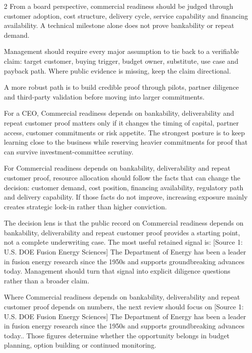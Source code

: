 \documentclass[10pt,a4paper]{article}
\begin{document}
\begin{multicols}{2}
{\small From a board perspective, commercial readiness should be judged through customer adoption, cost structure, delivery cycle, service capability and financing availability. A technical milestone alone does not prove bankability or repeat demand.}\par
{\small Management should require every major assumption to tie back to a verifiable claim: target customer, buying trigger, budget owner, substitute, use case and payback path. Where public evidence is missing, keep the claim directional.}\par
{\small A more robust path is to build credible proof through pilots, partner diligence and third-party validation before moving into larger commitments.}\par
{\small For a CEO, Commercial readiness depends on bankability, deliverability and repeat customer proof matters only if it changes the timing of capital, partner access, customer commitments or risk appetite. The strongest posture is to keep learning close to the business while reserving heavier commitments for proof that can survive investment-committee scrutiny.}\par
{\small For Commercial readiness depends on bankability, deliverability and repeat customer proof, resource allocation should follow the facts that can change the decision: customer demand, cost position, financing availability, regulatory path and delivery capability. If those facts do not improve, increasing exposure mainly creates strategic lock-in rather than higher conviction.}\par
{\small The decision lens is that the public record on Commercial readiness depends on bankability, deliverability and repeat customer proof provides a starting point, not a complete underwriting case. The most useful retained signal is: [Source 1: U.S. DOE Fusion Energy Sciences] The Department of Energy has been a leader in fusion energy research since the 1950s and supports groundbreaking advances today. Management should turn that signal into explicit diligence questions rather than a broader claim.}\par
{\small Where Commercial readiness depends on bankability, deliverability and repeat customer proof depends on numbers, the next review should focus on [Source 1: U.S. DOE Fusion Energy Sciences] The Department of Energy has been a leader in fusion energy research since the 1950s and supports groundbreaking advances today.. Those figures determine whether the opportunity belongs in budget planning, option building or continued monitoring.}\par
\end{multicols}
\label{chap:5:end}
\end{document}
